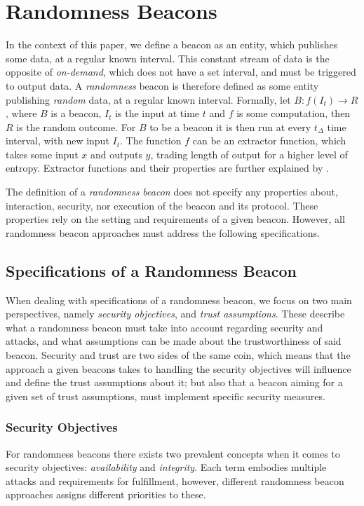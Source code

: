 

\section{Randomness Beacons}
In the context of this paper, we define a beacon as an entity, which publishes some data, at a regular known interval.
This constant stream of data is the opposite of \emph{on-demand}, which does not have a set interval, and must be triggered to output data.
A \emph{randomness} beacon is therefore defined as some entity publishing \emph{random} data, at a regular known interval.
Formally, let $B: f(I_t) \rightarrow R$, where $B$ is a beacon, $I_t$ is the input at time $t$ and $f$ is some computation, then $R$ is the random outcome.
For $B$ to be a beacon it is then run at every $t_\Delta$ time interval, with new input $I_t$.
The function $f$ can be an extractor function, which takes some input $x$ and outputs $y$, trading length of output for a higher level of entropy.
Extractor functions and their properties are further explained by \citet{bonneau2015bitcoin}.

The definition of a \emph{randomness beacon} does not specify any properties about, interaction, security, nor execution of the beacon and its protocol.
These properties rely on the setting and requirements of a given beacon.
However, all randomness beacon approaches must address the following specifications.

\subsection{Specifications of a Randomness Beacon}
When dealing with specifications of a randomness beacon, we focus on two main perspectives, namely \emph{security objectives}, and \emph{trust assumptions}.
These describe what a randomness beacon must take into account regarding security and attacks, and what assumptions can be made about the trustworthiness of said beacon.
Security and trust are two sides of the same coin, which means that the approach a given beacons takes to handling the security objectives will influence and define the trust assumptions about it;
but also that a beacon aiming for a given set of trust assumptions, must implement specific security measures.
\subsubsection{Security Objectives}\label{ssub:security_objectives}
For randomness beacons there exists two prevalent concepts when it comes to security objectives: \emph{availability} and \emph{integrity}.
Each term embodies multiple attacks and requirements for fulfillment, however, different randomness beacon approaches assigns different priorities to these.

